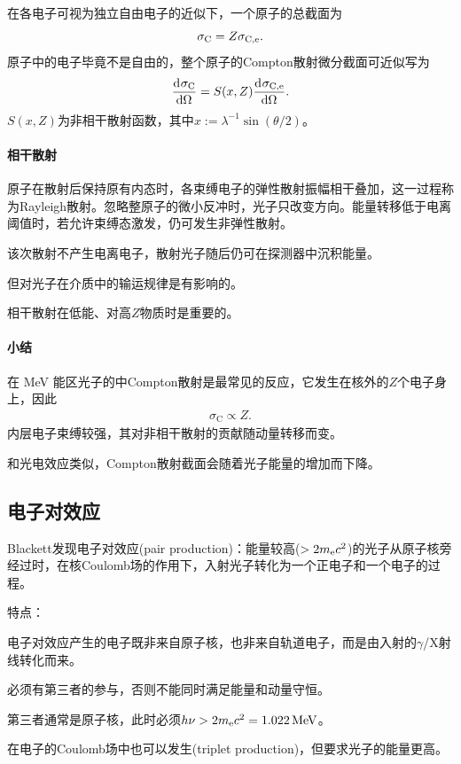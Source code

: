 在各电子可视为独立自由电子的近似下，一个原子的总截面为
\[
	\sigma_\mathrm C = Z\sigma_{\mathrm C,\mathrm{e}}.
\]
原子中的电子毕竟不是自由的，整个原子的Compton散射微分截面可近似写为
\begin{align}
	\frac{\mathop{}\!\mathrm{d}^{}\sigma_\mathrm C}{\mathrm{d}{\Omega}^{}} = S(x,Z)\frac{\mathop{}\!\mathrm{d}^{}\sigma_{\mathrm C,\mathrm{e}}}{\mathrm{d}{\Omega}^{}}.
\end{align}
$S(x,Z)$为非相干散射函数，其中$x := \lambda^{-1}\sin(\theta/2)$。
\paragraph{相干散射}
原子在散射后保持原有内态时，各束缚电子的弹性散射振幅相干叠加，这一过程称为Rayleigh散射。忽略整原子的微小反冲时，光子只改变方向。能量转移低于电离阈值时，若允许束缚态激发，仍可发生非弹性散射。
\begin{compactenum}
	\item 该次散射不产生电离电子，散射光子随后仍可在探测器中沉积能量。
	\item 但对光子在介质中的输运规律是有影响的。
	\item 相干散射在低能、对高$Z$物质时是重要的。
\end{compactenum}
\paragraph{小结}在 \unit{MeV} 能区光子的中Compton散射是最常见的反应，它发生在核外的$Z$个电子身上，因此
\begin{align}
	\sigma_\mathrm C \propto Z.
\end{align}
内层电子束缚较强，其对非相干散射的贡献随动量转移而变。

和光电效应类似，Compton散射截面会随着光子能量的增加而下降。

\subsection{电子对效应}

Blackett发现电子对效应(pair production)：能量较高($> 2m_{\mathrm{e}} c^2$)的光子从原子核旁经过时，在核Coulomb场的作用下，入射光子转化为一个正电子和一个电子的过程。

特点：
\begin{compactenum}
	\item 电子对效应产生的电子既非来自原子核，也非来自轨道电子，而是由入射的$\gamma$/X射线转化而来。
	\item 必须有第三者的参与，否则不能同时满足能量和动量守恒。
	\item 第三者通常是原子核，此时必须$h\nu > 2m_{\mathrm{e}} c^2 = \qty{1.022}{MeV}$。
	\item 在电子的Coulomb场中也可以发生(triplet production)，但要求光子的能量更高。
\end{compactenum}

